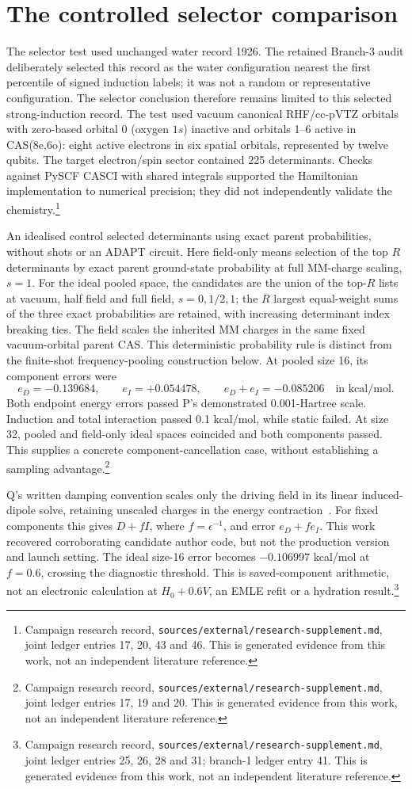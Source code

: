 \documentclass{article}
\newcommand{\record}[1]{\footnote{Campaign research record, \texttt{sources/external/research-supplement.md}, #1. This is generated evidence from this work, not an independent literature reference.}}
\begin{document}
\section{The controlled selector comparison}
The selector test used unchanged water record 1926. The retained Branch-3 audit deliberately selected this record as the water configuration nearest the first percentile of signed induction labels; it was not a random or representative configuration. The selector conclusion therefore remains limited to this selected strong-induction record. The test used vacuum canonical RHF/cc-pVTZ orbitals with zero-based orbital 0 (oxygen \(1s\)) inactive and orbitals 1--6 active in CAS(8e,6o): eight active electrons in six spatial orbitals, represented by twelve qubits. The target electron/spin sector contained 225 determinants. Checks against PySCF CASCI with shared integrals supported the Hamiltonian implementation to numerical precision; they did not independently validate the chemistry.\record{joint ledger entries 17, 20, 43 and 46}

An idealised control selected determinants using exact parent probabilities, without shots or an ADAPT circuit. Here field-only means selection of the top \(R\) determinants by exact parent ground-state probability at full MM-charge scaling, \(s=1\). For the ideal pooled space, the candidates are the union of the top-\(R\) lists at vacuum, half field and full field, \(s=0,1/2,1\); the \(R\) largest equal-weight sums of the three exact probabilities are retained, with increasing determinant index breaking ties. The field scales the inherited MM charges in the same fixed vacuum-orbital parent CAS. This deterministic probability rule is distinct from the finite-shot frequency-pooling construction below. At pooled size 16, its component errors were
\[
 e_D=-0.139684,\qquad e_I=+0.054478,\qquad
 e_D+e_I=-0.085206
 \quad\text{in kcal/mol}.
\]
Both endpoint energy errors passed P's demonstrated 0.001-Hartree scale. Induction and total interaction passed 0.1 kcal/mol, while static failed. At size 32, pooled and field-only ideal spaces coincided and both components passed. This supplies a concrete component-cancellation case, without establishing a sampling advantage.\record{joint ledger entries 17, 19 and 20}

Q's written damping convention scales only the driving field in its linear induced-dipole solve, retaining unscaled charges in the energy contraction~\cite{Q}. For fixed components this gives \(D+fI\), where \(f=\epsilon^{-1}\), and error \(e_D+fe_I\). This work recovered corroborating candidate author code, but not the production version and launch setting. The ideal size-16 error becomes \(-0.106997\) kcal/mol at \(f=0.6\), crossing the diagnostic threshold. This is saved-component arithmetic, not an electronic calculation at \(H_0+0.6V\), an EMLE refit or a hydration result.\record{joint ledger entries 25, 26, 28 and 31; branch-1 ledger entry 41}
\end{document}
